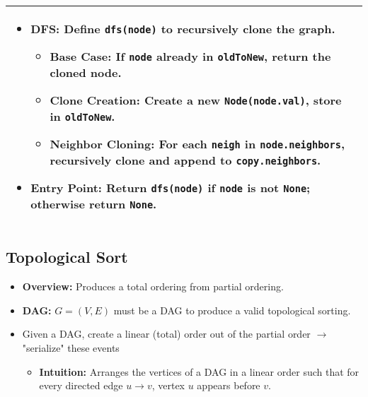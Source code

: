 \begin{summary}
\begin{center}
\begin{tabular}{ll}
{\begin{itemize}
                    \item \textbf{DFS:} Define \texttt{dfs(node)} to recursively clone the graph.
                    \begin{itemize}
                        \item \textbf{Base Case:} If \texttt{node} already in \texttt{oldToNew}, return the cloned node.
                        \item \textbf{Clone Creation:} Create a new \texttt{Node(node.val)}, store in \texttt{oldToNew}.
                        \item \textbf{Neighbor Cloning:} For each \texttt{neigh} in \texttt{node.neighbors}, recursively clone and append to \texttt{copy.neighbors}.
                    \end{itemize}
                
                    \item \textbf{Entry Point:} Return \texttt{dfs(node)} if \texttt{node} is not \texttt{None}; otherwise return \texttt{None}.
                \end{itemize}                
            } \\
            \midrule 
        \end{tabular}
    \end{center}
\end{summary}
\newpage

\subsection{Topological Sort}
\begin{summary}
    \begin{itemize}
        \item \textbf{Overview:} Produces a total ordering from partial ordering.
        \item \textbf{DAG:} $G=(V,E)$ must be a DAG to produce a valid topological sorting. 
        \item Given a DAG, create a linear (total) order out of the partial order $\rightarrow$ "serialize" these events 
        \begin{itemize}
            \item \textbf{Intuition:} Arranges the vertices of a DAG in a linear order such that for every directed edge \( u \to v \), vertex \( u \) appears before \( v \).
        \end{itemize}
    \end{itemize}
\end{summary}

